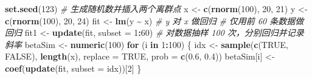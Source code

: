 \documentclass[
  b5paper,
  UTF8,twoside]{book}
\newenvironment{Shaded}{\begin{snugshade}}{\end{snugshade}}
\newcommand{\AttributeTok}[1]{\textcolor[rgb]{0.13,0.29,0.53}{#1}}
\newcommand{\CommentTok}[1]{\textcolor[rgb]{0.56,0.35,0.01}{\textit{#1}}}
\newcommand{\ConstantTok}[1]{\textcolor[rgb]{0.56,0.35,0.01}{#1}}
\newcommand{\ControlFlowTok}[1]{\textcolor[rgb]{0.13,0.29,0.53}{\textbf{#1}}}
\newcommand{\DecValTok}[1]{\textcolor[rgb]{0.00,0.00,0.81}{#1}}
\newcommand{\FloatTok}[1]{\textcolor[rgb]{0.00,0.00,0.81}{#1}}
\newcommand{\FunctionTok}[1]{\textcolor[rgb]{0.13,0.29,0.53}{\textbf{#1}}}
\newcommand{\NormalTok}[1]{#1}
\newcommand{\OtherTok}[1]{\textcolor[rgb]{0.56,0.35,0.01}{#1}}
\newcommand{\SpecialCharTok}[1]{\textcolor[rgb]{0.81,0.36,0.00}{\textbf{#1}}}
\begin{document}
\begin{Shaded}
\begin{Highlighting}[]
\FunctionTok{set.seed}\NormalTok{(}\DecValTok{123}\NormalTok{)}
\CommentTok{\# 生成随机数并插入两个离群点}
\NormalTok{x }\OtherTok{\textless{}{-}} \FunctionTok{c}\NormalTok{(}\FunctionTok{rnorm}\NormalTok{(}\DecValTok{100}\NormalTok{), }\DecValTok{20}\NormalTok{, }\DecValTok{21}\NormalTok{)}
\NormalTok{y }\OtherTok{\textless{}{-}} \FunctionTok{c}\NormalTok{(}\FunctionTok{rnorm}\NormalTok{(}\DecValTok{100}\NormalTok{), }\DecValTok{20}\NormalTok{, }\DecValTok{24}\NormalTok{)}
\NormalTok{fit }\OtherTok{\textless{}{-}} \FunctionTok{lm}\NormalTok{(y }\SpecialCharTok{\textasciitilde{}}\NormalTok{ x) }\CommentTok{\# y 对 x 做回归}
\CommentTok{\# 仅用前 60 条数据做回归}
\NormalTok{fit1 }\OtherTok{\textless{}{-}} \FunctionTok{update}\NormalTok{(fit, }\AttributeTok{subset =} \DecValTok{1}\SpecialCharTok{:}\DecValTok{60}\NormalTok{)}
\CommentTok{\# 对数据抽样 100 次，分别回归并记录斜率}
\NormalTok{betaSim }\OtherTok{\textless{}{-}} \FunctionTok{numeric}\NormalTok{(}\DecValTok{100}\NormalTok{)}
\ControlFlowTok{for}\NormalTok{ (i }\ControlFlowTok{in} \DecValTok{1}\SpecialCharTok{:}\DecValTok{100}\NormalTok{) \{}
\NormalTok{  idx }\OtherTok{\textless{}{-}} \FunctionTok{sample}\NormalTok{(}\FunctionTok{c}\NormalTok{(}\ConstantTok{TRUE}\NormalTok{, }\ConstantTok{FALSE}\NormalTok{), }\FunctionTok{length}\NormalTok{(x), }\AttributeTok{replace =} \ConstantTok{TRUE}\NormalTok{, }
                \AttributeTok{prob =} \FunctionTok{c}\NormalTok{(}\FloatTok{0.6}\NormalTok{, }\FloatTok{0.4}\NormalTok{))}
\NormalTok{  betaSim[i] }\OtherTok{\textless{}{-}} \FunctionTok{coef}\NormalTok{(}\FunctionTok{update}\NormalTok{(fit, }\AttributeTok{subset =}\NormalTok{ idx))[}\DecValTok{2}\NormalTok{]}
\NormalTok{\}}
\end{Highlighting}
\end{Shaded}
\end{document}
